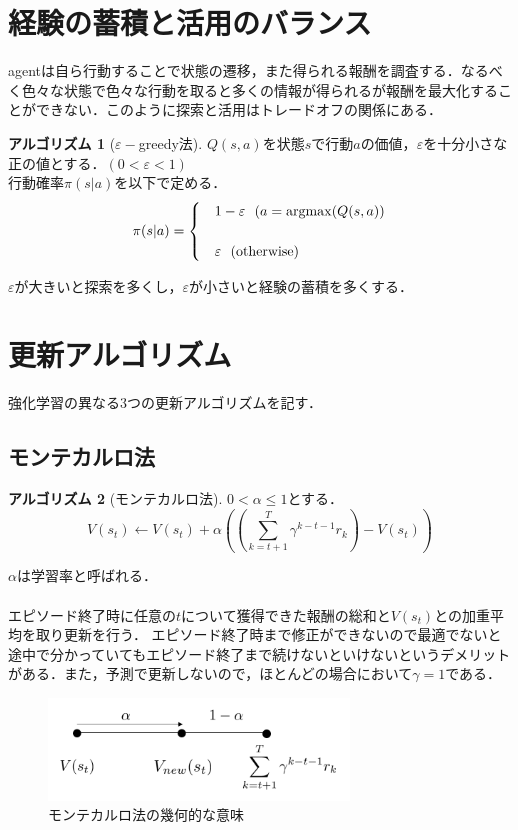 \documentclass[a4paper,12pt]{jsreport}
\theoremstyle{definition}
\newtheorem{algorithm}{アルゴリズム}
\begin{document}
\section{経験の蓄積と活用のバランス}
agentは自ら行動することで状態の遷移，また得られる報酬を調査する．なるべく色々な状態で色々な行動を取ると多くの情報が得られるが報酬を最大化することができない．このように探索と活用はトレードオフの関係にある．\newpage
\begin{algorithm}[$\varepsilon-$greedy法]
    $Q(s,a)$を状態$s$で行動$a$の価値，$\varepsilon$を十分小さな正の値とする．$(0<\varepsilon<1)$\\
    行動確率$\pi(s|a)$を以下で定める．
    \begin{eqnarray}
        \pi(s|a)=
            \begin{cases}
                & 1-\varepsilon \ \ (a={\rm argmax}(Q(s,a))\\ \\
                & \varepsilon \ \ ({\rm otherwise})
            \end{cases}
    \end{eqnarray}
\end{algorithm}
$\varepsilon$が大きいと探索を多くし，$\varepsilon$が小さいと経験の蓄積を多くする．
\section{更新アルゴリズム}
強化学習の異なる3つの更新アルゴリズムを記す．
\subsection{モンテカルロ法}
\begin{algorithm}[モンテカルロ法]
    $0<\alpha\leq1$とする．
    \begin{equation}
        V(s_t)\leftarrow V(s_t)+\alpha
        \left(\left(\sum_{k=t+1}^T\gamma^{k-t-1}r_k\right)-V(s_t)\right)
    \end{equation}
\end{algorithm}
$\alpha$は学習率と呼ばれる．\\
\\
エピソード終了時に任意の$t$について獲得できた報酬の総和と$V(s_t)$との加重平均を取り更新を行う．
エピソード終了時まで修正ができないので最適でないと途中で分かっていてもエピソード終了まで続けないといけないというデメリットがある．また，予測で更新しないので，ほとんどの場合において$\gamma=1$である．
\begin{figure}[h]
    \centering
    \includegraphics[width=8cm]{monte.png}
    \caption{モンテカルロ法の幾何的な意味}
    \label{fig:monte}
\end{figure}
\end{document}
